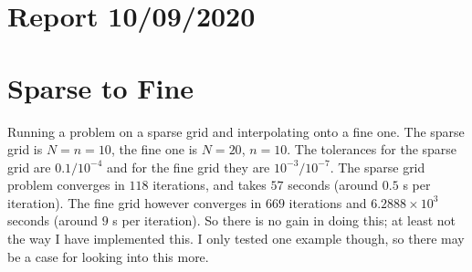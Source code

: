 \documentclass[11pt, a4paper]{article}
\theoremstyle{definition}
\begin{document}
	\section{Report 10/09/2020}

	
	
	\section{Sparse to Fine}
	Running a problem on a sparse grid and interpolating onto a fine one. The sparse grid is $N = n = 10$, the fine one is $N = 20$, $n = 10$. The tolerances for the sparse grid are $0.1/10^{-4}$ and for the fine grid they are $10^{-3}/10^{-7}$. The sparse grid problem converges in $118$ iterations, and takes $57$ seconds (around $0.5$ s per iteration). The fine grid however converges in $669$ iterations and $6.2888 \times  10^3$ seconds (around $9$ s per iteration). So there is no gain in doing this; at least not the way I have implemented this. I only tested one example though, so there may be a case for looking into this more.
	
\end{document}
